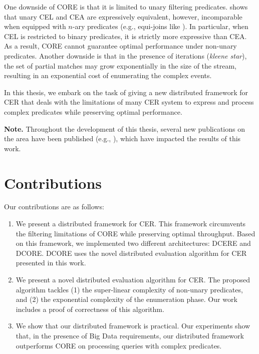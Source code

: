 One downside of CORE is that it is limited to unary filtering predicates. \cite{on-the-expressiveness} shows that unary CEL and CEA are expressively equivalent, however, incomparable when equipped with $n$-ary predicates (e.g., equi-joins like ). In particular, when CEL is restricted to binary predicates, it is strictly more expressive than CEA. As a result, CORE cannot guarantee optimal performance under non-unary predicates. Another downside is that in the presence of iterations (\emph{kleene star}), the set of partial matches may grow exponentially in the size of the stream, resulting in an exponential cost of enumerating the complex events.

In this thesis, we embark on the task of giving a new distributed framework for CER that deals with the limitations of many CER system to express and process complex predicates while preserving optimal performance.

\textbf{Note.} Throughout the development of this thesis, several new publications on the area have been published (e.g., \cite{formal-framework-cer, core}), which have impacted the results of this work.

\section{Contributions}
\label{sec:contribution}

Our contributions are as follows:

\begin{enumerate}[label=(\roman*)]
  \item We present a distributed framework for CER. This framework circumvents the filtering limitations of CORE while preserving optimal throughput. Based on this framework, we implemented two different architectures: DCERE and DCORE. DCORE uses the novel distributed evaluation algorithm for CER presented in this work.

  \item We present a novel distributed evaluation algorithm for CER. The proposed algorithm tackles (1) the super-linear complexity of non-unary predicates, and (2) the exponential complexity of the enumeration phase. Our work includes a proof of correctness of this algorithm.

  \item We show that our distributed framework is practical. Our experiments show that, in the presence of Big Data requirements, our distributed framework outperforms CORE on processing queries with complex predicates.
\end{enumerate}

